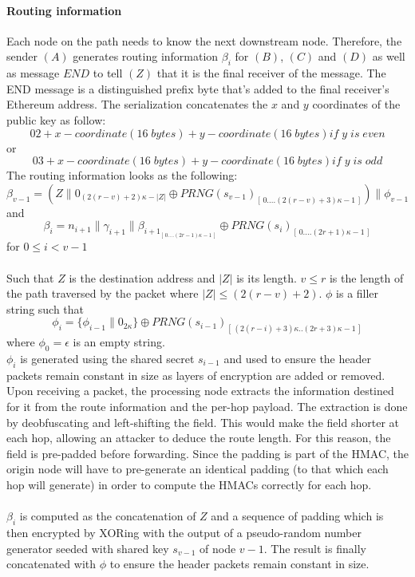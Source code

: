     \paragraph{Routing information}
    Each node on the path needs to know the next downstream node. Therefore, the sender $(A)$ generates routing information $\beta_i$ for $(B)$, $(C)$ and $(D)$ as well as message $END$ to tell $(Z)$ that it is the final receiver of the message. The END message is a distinguished prefix byte that's added to the final receiver's Ethereum address. The serialization concatenates the $x$ and $y$ coordinates of the public key as follow:
    $$02 + x-coordinate (16\; bytes) + y-coordinate (16\; bytes) if\; y \;is \;even$$
    or $$03 + x-coordinate (16\; bytes) + y-coordinate (16\; bytes) if\; y \;is \;odd$$
The routing information looks as the following:
    $$\beta_{v-1}=(Z\|0_{(2(r-v)+2)\kappa-|Z|}\oplus PRNG(s_{v-1})_{[ \,0....(2(r-v)+3)\kappa-1\,]})\|\phi_{v-1}$$
    and
    $$\beta_i=n_{i+1}\|\gamma_{i+1}\|\beta_{{i+1}_{[ \,0....(2r-1)\kappa-1\,] }}\oplus PRNG(s_{i})_{[ \,0....(2r+1)\kappa-1\,]} $$ for $0\le i < v-1$ 
    \\~\\Such that $Z$ is the destination address and $|Z|$ is its length.
    $v\leq r$ is the length of the path traversed by the packet where $|Z| \leq (2(r - v) + 2)$. $\phi$ is a filler string such that
    $$\phi_i=\{ \phi_{i-1}\|0_{2\kappa}\}\oplus PRNG(s_{i-1})_{[ \,(2(r-i)+3)\kappa..(2r+3)\kappa-1\,]}$$ where $\phi_0=\epsilon$ is an empty string.
    \\$\phi_i$ is generated using the shared secret $s_{i-1}$ and used to ensure the header packets remain constant in size as layers of encryption are added or removed. Upon receiving a packet, the processing node extracts the information destined for it from the route information and the per-hop payload. The extraction is done by deobfuscating and left-shifting the field. This would make the field shorter at each hop, allowing an attacker to deduce the route length. For this reason, the field is pre-padded before forwarding. Since the padding is part of the HMAC, the origin node will have to pre-generate an identical padding (to that which each hop will generate) in order to compute the HMACs correctly for each hop.
    \\~\\$\beta_i$ is computed as the concatenation of $Z$ and a sequence of padding which is then encrypted by XORing with the output of a pseudo-random number generator seeded with shared key $s_{v-1}$ of node $v-1$. The result is finally concatenated with $\phi$ to ensure the header packets remain constant in size.
